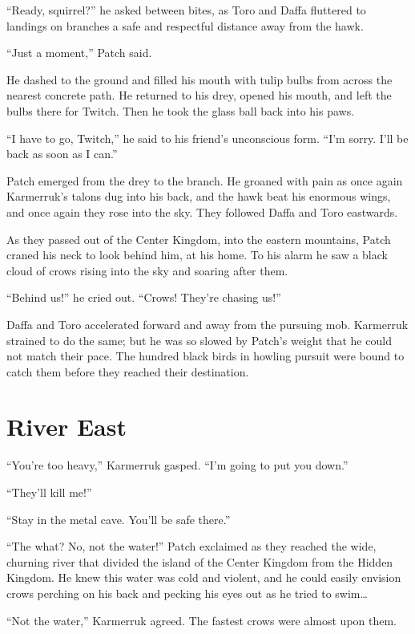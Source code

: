 \documentclass[ebook,oneside,openany,17pt]{memoir}
\newenvironment{tolerant}[1]{%
  \par\tolerance=#1\relax
}{%
  \par
}
\renewcommand{\thechapter}{\Roman{chapter}}
\newcounter{sections}
\newcommand{\sections}[1]{%
  \section*{#1}
  \addtocounter{sections}{1}%
  \pdfbookmark[1]{#1}{section.\thechapter.\thesections}}
\begin{document}
\begin{tolerant}{500}
“Ready, squirrel?” he asked between bites, as Toro and Daffa fluttered
to landings on branches a safe and respectful distance away from the
hawk.
\end{tolerant}

“Just a moment,” Patch said.

He dashed to the ground and filled his mouth with tulip bulbs from
across the nearest concrete path. He returned to his drey, opened his
mouth, and left the bulbs there for Twitch. Then he took the glass
ball back into his paws.

“I have to go, Twitch,” he said to his friend’s unconscious form. “I’m
sorry. I’ll be back as soon as I can.”

Patch emerged from the drey to the branch. He groaned with pain as
once again Karmerruk’s talons dug into his back, and the hawk beat his
enormous wings, and once again they rose into the sky. They followed
Daffa and Toro eastwards.

As they passed out of the Center Kingdom, into the eastern mountains,
Patch craned his neck to look behind him, at his home. To his alarm he
saw a black cloud of crows rising into the sky and soaring after them.

“Behind us!” he cried out. “Crows! They’re chasing us!”

\begin{tolerant}{1000}
Daffa and Toro accelerated forward and away from the pursuing
mob. Karmerruk strained to do the same; but he was so slowed by
Patch’s weight that he could not match their pace. The hundred black
birds in howling pursuit were bound to catch them before they reached
their destination.
\end{tolerant}


\sections{River East}

“You’re too heavy,” Karmerruk gasped. “I’m going to put you down.”

“They’ll kill me!”

“Stay in the metal cave. You’ll be safe there.”

“The what? No, not the water!” Patch exclaimed as they reached the
wide, churning river that divided the island of the Center Kingdom
from the Hidden Kingdom. He knew this water was cold and violent, and
he could easily envision crows perching on his back and pecking his
eyes out as he tried to swim…

“Not the water,” Karmerruk agreed. The fastest crows were almost upon
them.
\end{document}
